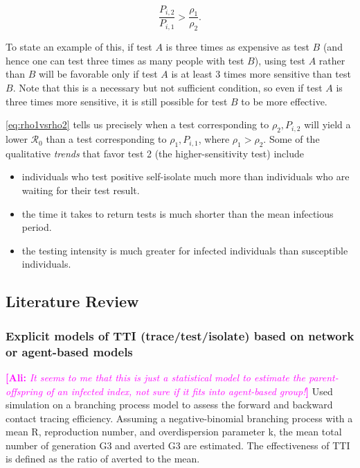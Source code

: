 \documentclass[12pt]{article}
\newcommand{\Rnum}{\mathcal{R}_0}
\newcommand{\comment}{\showcomment}
\newcommand{\showcomment}[3]{\textcolor{#1}{\textbf{[#2: }\textsl{#3}\textbf{]}}}
\newcommand{\ali}[1]{\comment{magenta}{Ali}{#1}}
\theoremstyle{definition} %
\begin{document}
\begin{equation}
\frac{P_{i,2}}{P_{i,1}} > \frac{\rho_1}{\rho_2}.
\end{equation}

To state an example of this, if test $A$ is three times as expensive as test $B$ (and hence one can test three times as many people with test $B$), using test $A$ rather than $B$ will be favorable only if test $A$ is at least 3 times more sensitive than test $B$. Note that this is a necessary but not sufficient condition, so even if test $A$ is three times more sensitive, it is still possible for test $B$ to be more effective. 

\cref{eq:rho1vsrho2} tells us precisely when a test corresponding to $\rho_2, P_{i,2}$ will yield a lower $\Rnum$ than a test corresponding to $\rho_1, P_{i,1}$, where $\rho_1 > \rho_2$. Some of the qualitative \textit{trends} that favor test 2 (the higher-sensitivity test) include

\begin{itemize}
    \item individuals who test positive self-isolate much more than individuals who are waiting for their test result.
    \item the time it takes to return tests is much shorter than the mean infectious period.
    \item the testing intensity is much greater for infected individuals than susceptible individuals.
\end{itemize}


\subsection{Literature Review}

\subsubsection{Explicit models of TTI (trace/test/isolate) based on network or agent-based models}
\citep{endo2020implication} \ali{It seems to me that this is just a statistical model to estimate the parent-offspring of an infected index, not sure if it fits into agent-based group!} Used simulation on a branching process model to assess the forward and backward contact tracing efficiency. Assuming a negative-binomial branching process with a mean R, reproduction number, and overdispersion parameter k, the mean total number of generation G3 and averted G3 are estimated. The effectiveness of TTI is defined as the ratio of averted to the mean.
\end{document}
